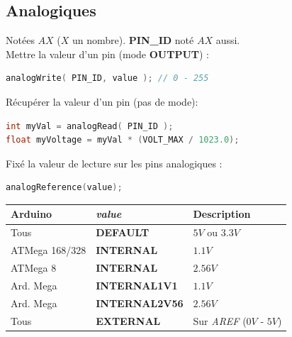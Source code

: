         \subsection{Analogiques}
            \bmar
                Notées $AX$ ($X$ un nombre). \textbf{PIN\_ID} noté $AX$ aussi.\\
                Mettre la valeur d'un pin (mode \textbf{OUTPUT}) :
            \emar

            \begin{lstlisting}[language=C]
analogWrite( PIN_ID, value ); // 0 - 255
            \end{lstlisting}
            \vspace{0.5cm}
            \bmar
                Récupérer la valeur d'un pin (pas de mode):
            \emar

            \begin{lstlisting}[language=C]
int myVal = analogRead( PIN_ID );
float myVoltage = myVal * (VOLT_MAX / 1023.0);
            \end{lstlisting}

            \bmar
                Fixé la valeur de lecture sur les pins analogiques :
            \emar

            \begin{lstlisting}[language=C]
analogReference(value);
            \end{lstlisting}
            \begin{center}
                \begin{tabular}{| l | l | l |}
                    \hline
                        Arduino & \textit{value} & Description \\
                    \hline
                        Tous & \textbf{DEFAULT} & $5V$ ou $3.3V$ \\
                        ATMega 168/328 & \textbf{INTERNAL} & $1.1V$ \\
                        ATMega 8 & \textbf{INTERNAL} & $2.56V$ \\
                        Ard. Mega & \textbf{INTERNAL1V1} & $1.1V$ \\
                        Ard. Mega & \textbf{INTERNAL2V56} & $2.56V$ \\
                        Tous & \textbf{EXTERNAL} & Sur \textit{AREF} ($0V$ - $5V$) \\
                    \hline
                \end{tabular}
            \end{center}

